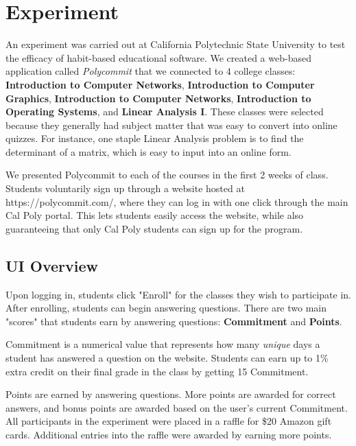 
\section{Experiment}
\par An experiment was carried out at California Polytechnic State University to test the efficacy of habit-based educational software. We created a web-based application called \textit{Polycommit} that we connected to 4 college classes: \textbf{Introduction to Computer Networks}, \textbf{Introduction to Computer Graphics}, \textbf{Introduction to Computer Networks}, \textbf{Introduction to Operating Systems}, and \textbf{Linear Analysis I}. These classes were selected because they generally had subject matter that was easy to convert into online quizzes. For instance, one staple Linear Analysis problem is to find the determinant of a matrix, which is easy to input into an online form.

\par We presented Polycommit to each of the courses in the first 2 weeks of class. Students voluntarily sign up through a website hosted at https://polycommit.com/, where they can log in with one click through the main Cal Poly portal. This lets students easily access the website, while also guaranteeing that only Cal Poly students can sign up for the program.

\subsection{UI Overview}
\par Upon logging in, students click "Enroll" for the classes they wish to participate in. After enrolling, students can begin answering questions. There are two main "scores" that students earn by answering questions: \textbf{Commitment} and \textbf{Points}.

\par Commitment is a numerical value that represents how many \textit{unique} days a student has answered a question on the website. Students can earn up to 1\% extra credit on their final grade in the class by getting 15 Commitment.

\par Points are earned by answering questions. More points are awarded for correct answers, and bonus points are awarded based on the user's current Commitment. All participants in the experiment were placed in a raffle for \$20 Amazon gift cards. Additional entries into the raffle were awarded by earning more points.

